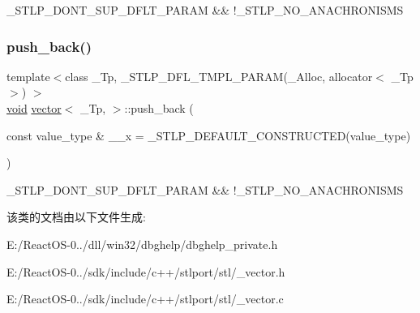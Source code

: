\+\_\+\+S\+T\+L\+P\+\_\+\+D\+O\+N\+T\+\_\+\+S\+U\+P\+\_\+\+D\+F\+L\+T\+\_\+\+P\+A\+R\+AM \&\& !\+\_\+\+S\+T\+L\+P\+\_\+\+N\+O\+\_\+\+A\+N\+A\+C\+H\+R\+O\+N\+I\+S\+MS \mbox{\label{structvector_a74248d6152706c9f6857f9a1ffd5c937}} 
\subsubsection{\texorpdfstring{push\+\_\+back()}{push\_back()}}
{\footnotesize\ttfamily template$<$class \+\_\+\+Tp, \+\_\+\+S\+T\+L\+P\+\_\+\+D\+F\+L\+\_\+\+T\+M\+P\+L\+\_\+\+P\+A\+R\+A\+M(\+\_\+\+Alloc, allocator$<$ \+\_\+\+Tp $>$) $>$ \\
\hyperlink{interfacevoid}{void} \hyperlink{structvector}{vector}$<$ \+\_\+\+Tp, $>$\+::push\+\_\+back (\begin{DoxyParamCaption}\item[{const value\+\_\+type \&}]{\+\_\+\+\_\+x = {\ttfamily \+\_\+STLP\+\_\+DEFAULT\+\_\+CONSTRUCTED(value\+\_\+type)} }\end{DoxyParamCaption})\hspace{0.3cm}{\ttfamily [inline]}}

\+\_\+\+S\+T\+L\+P\+\_\+\+D\+O\+N\+T\+\_\+\+S\+U\+P\+\_\+\+D\+F\+L\+T\+\_\+\+P\+A\+R\+AM \&\& !\+\_\+\+S\+T\+L\+P\+\_\+\+N\+O\+\_\+\+A\+N\+A\+C\+H\+R\+O\+N\+I\+S\+MS 

该类的文档由以下文件生成\+:\begin{DoxyCompactItemize}
\item 
E\+:/\+React\+O\+S-\/0../dll/win32/dbghelp/dbghelp\+\_\+private.\+h\item 
E\+:/\+React\+O\+S-\/0../sdk/include/c++/stlport/stl/\+\_\+vector.\+h\item 
E\+:/\+React\+O\+S-\/0../sdk/include/c++/stlport/stl/\+\_\+vector.\+c\end{DoxyCompactItemize}
